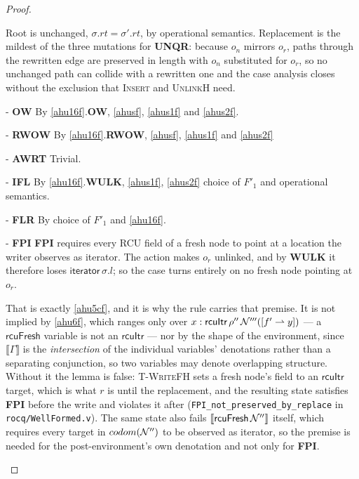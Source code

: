 \begin{proof}
\begin{case}
Root is unchanged, $\sigma.rt = \sigma'.rt$, by operational semantics.  Replacement
is the mildest of the three mutations for \textbf{UNQR}: because $o_n$ mirrors
$o_r$, paths through the rewritten edge are preserved in length with $o_n$
substituted for $o_r$, so no unchanged path can collide with a rewritten one and
the case analysis closes without the exclusion that \textsc{Insert} and
\textsc{UnlinkH} need.
\end{case}
\begin{case} - \textbf{OW} By \ref{ahu16f}.\textbf{OW}, \ref{ahusf}, \ref{ahus1f} and \ref{ahus2f}.
\end{case}
\begin{case} - \textbf{RWOW} By \ref{ahu16f}.\textbf{RWOW}, \ref{ahusf}, \ref{ahus1f} and \ref{ahus2f}
\end{case}
\begin{case} - \textbf{AWRT} Trivial.
\end{case}
\begin{case} - \textbf{IFL}  By \ref{ahu16f}.\textbf{WULK}, \ref{ahus1f}, \ref{ahus2f} choice of $F'_1$ and operational semantics.
\end{case}
\begin{case} - \textbf{FLR} By choice of $F'_1$ and \ref{ahu16f}. 
\end{case}
\begin{case} - \textbf{FPI}
\textbf{FPI} requires every \textsf{RCU} field of a \textsf{fresh} node to point
at a location the writer observes as \textsf{iterator}.  The action makes $o_r$
\textsf{unlinked}, and by \textbf{WULK} it therefore loses
$\textsf{iterator}\,\sigma.l$; so the case turns entirely on no \textsf{fresh}
node pointing at $o_r$.

That is exactly \ref{ahu5cf}, and it is why the rule carries that premise.  It
is not implied by \ref{ahu6f}, which ranges only over
$x:\textsf{rcuItr}\,\rho''\,\mathcal{N}'''([f'\rightharpoonup y])$ --- a
$\textsf{rcuFresh}$ variable is not an $\textsf{rcuItr}$ --- nor by the shape of
the environment, since $\llbracket \Gamma \rrbracket$ is the \emph{intersection}
of the individual variables' denotations rather than a separating conjunction,
so two variables may denote overlapping structure.  Without it the lemma is
false: \textsc{T-WriteFH} sets a fresh node's field to an $\textsf{rcuItr}$
target, which is what $r$ is until the replacement, and the resulting state
satisfies \textbf{FPI} before the write and violates it after
(\texttt{FPI\_not\_preserved\_by\_replace} in \texttt{rocq/WellFormed.v}).  The
same state also fails $\llbracket \textsf{rcuFresh}\,\mathcal{N}''\rrbracket$ itself,
which requires every target in $codom(\mathcal{N}'')$ to be observed as
\textsf{iterator}, so the premise is needed for the post-environment's own
denotation and not only for \textbf{FPI}.


\end{case}
\end{proof}

